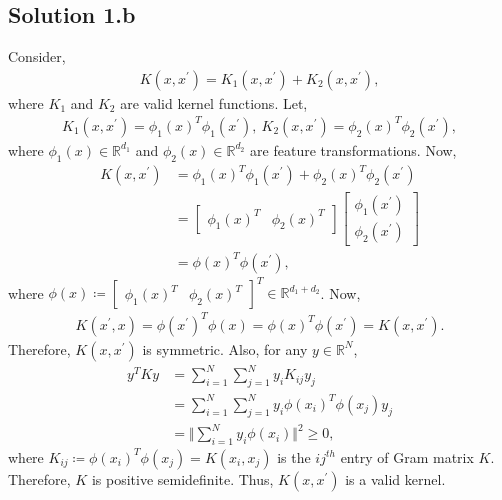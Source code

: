 \subsection*{Solution 1.b}
Consider,
\begin{align*}
	K(x, x^{\prime}) = K_1(x, x^{\prime}) + K_2(x, x^{\prime}),
\end{align*}
where $K_1$ and $K_2$ are valid kernel functions. Let,
\begin{align*}
	K_1(x, x^{\prime}) = \phi_1(x)^T\phi_1(x^{\prime}),\ K_2(x, x^{\prime}) = \phi_2(x)^T\phi_2(x^{\prime}),
\end{align*}
where $\phi_1(x) \in \mathbb{R}^{d_1}$ and $\phi_2(x) \in \mathbb{R}^{d_2}$ are feature transformations. Now,
\begin{align*}
	K(x, x^{\prime}) &= \phi_1(x)^T\phi_1(x^{\prime}) + \phi_2(x)^T\phi_2(x^{\prime})\\
	&= \begin{bmatrix}\phi_1(x)^T & \phi_2(x)^T\end{bmatrix}\begin{bmatrix}\phi_1(x^{\prime})\\\phi_2(x^{\prime})\end{bmatrix}\\
	&= \phi(x)^T\phi(x^{\prime}),
\end{align*}
where $\phi(x) \coloneqq \begin{bmatrix}\phi_1(x)^T & \phi_2(x)^T\end{bmatrix}^T \in \mathbb{R}^{d_1+d_2}$. Now,
\begin{align*}
	K(x^{\prime}, x) = \phi(x^{\prime})^T\phi(x) = \phi(x)^T\phi(x^{\prime}) = K(x, x^{\prime}).
\end{align*}
Therefore, $K(x, x^{\prime})$ is symmetric. Also,  for any $y \in \mathbb{R}^N$,
\begin{align*}
	y^TKy &= \sum_{i=1}^N\sum_{j=1}^N y_iK_{ij}y_j\\
	&= \sum_{i=1}^N\sum_{j=1}^N y_i\phi(x_i)^T\phi(x_j)y_j\\
	&= \Vert \sum_{i=1}^N y_i \phi(x_i) \Vert^2 \geq 0,
\end{align*}
where $K_{ij} \coloneqq \phi(x_i)^T\phi(x_j) = K(x_i, x_j	)$ is the $ij^{th}$ entry of Gram matrix $K$. Therefore, $K$ is positive semidefinite. Thus, $K(x, x^{\prime})$ is a valid kernel.